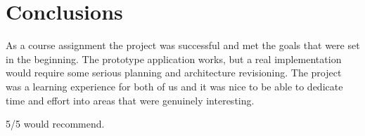 \section{Conclusions}
As a course assignment the project was successful and met the goals that were set in the beginning. The prototype application works, but a real implementation would require some serious planning and architecture revisioning. The project was a learning experience for both of us and it was nice to be able to dedicate time and effort into areas that were genuinely interesting.

5/5 would recommend.